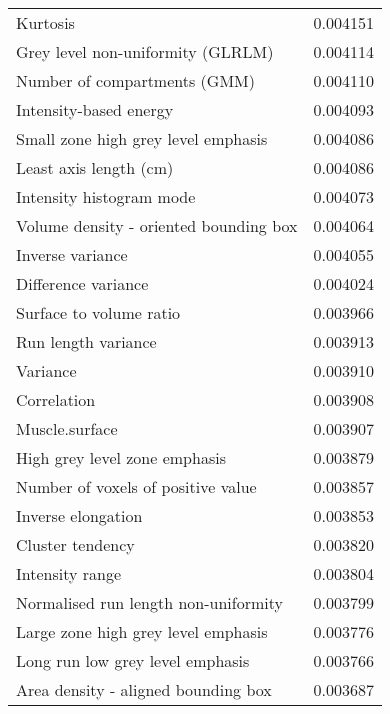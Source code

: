 \begin{longtable}{|lr|}
Kurtosis                                           &        0.004151 \\
Grey level non-uniformity (GLRLM)                  &        0.004114 \\
Number of compartments (GMM)                       &        0.004110 \\
Intensity-based energy                             &        0.004093 \\
Small zone high grey level emphasis                &        0.004086 \\
Least axis length (cm)                             &        0.004086 \\
Intensity histogram mode                           &        0.004073 \\
Volume density - oriented bounding box             &        0.004064 \\
Inverse variance                                   &        0.004055 \\
Difference variance                                &        0.004024 \\
Surface to volume ratio                            &        0.003966 \\
Run length variance                                &        0.003913 \\
Variance                                           &        0.003910 \\
Correlation                                        &        0.003908 \\
Muscle.surface                                     &        0.003907 \\
High grey level zone emphasis                      &        0.003879 \\
Number of voxels of positive value                 &        0.003857 \\
Inverse elongation                                 &        0.003853 \\
Cluster tendency                                   &        0.003820 \\
Intensity range                                    &        0.003804 \\
Normalised run length non-uniformity               &        0.003799 \\
Large zone high grey level emphasis                &        0.003776 \\
Long run low grey level emphasis                   &        0.003766 \\
Area density - aligned bounding box                &        0.003687 \\

\end{longtable}
